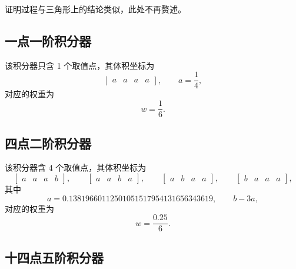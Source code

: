 证明过程与三角形上的结论类似，此处不再赘述。

\subsection{一点一阶积分器}

该积分器只含 1 个取值点，其体积坐标为
\begin{equation}
\begin{bmatrix}a & a & a & a\end{bmatrix},\qquad a=\frac{1}{4},
\end{equation}
对应的权重为
\begin{equation}
w=\frac{1}{6}.
\end{equation}


\subsection{四点二阶积分器}

该积分器含 4 个取值点，其体积坐标为
\begin{equation}
\begin{bmatrix}a & a & a & b\end{bmatrix},\qquad\begin{bmatrix}a & a & b & a\end{bmatrix},\qquad\begin{bmatrix}a & b & a & a\end{bmatrix},\qquad\begin{bmatrix}b & a & a & a\end{bmatrix},
\end{equation}
其中
\begin{equation}
a=0.13819660112501051517954131656343619,\qquad b-3a,
\end{equation}
对应的权重为
\begin{equation}
w=\frac{0.25}{6}.
\end{equation}


\subsection{十四点五阶积分器}

